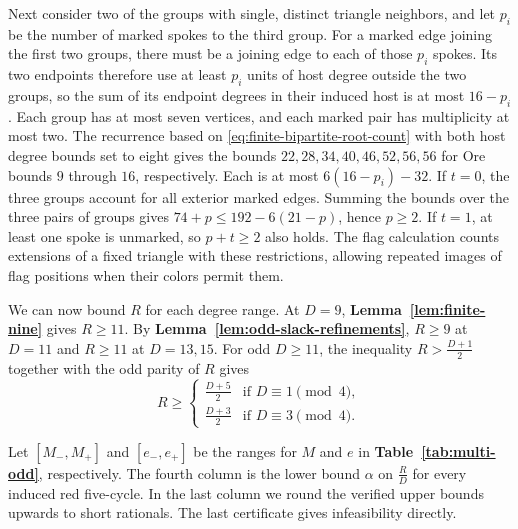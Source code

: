\documentclass[preprint,11pt,numbers]{elsarticle-arxiv}
\numberwithin{equation}{section}
\theoremstyle{definition}
\begin{document}
Next consider two of the groups with single, distinct
triangle neighbors, and let $p_i$ be the number of
marked spokes to the third group. For a marked edge joining the
first two groups, there must be a joining edge to each of those $p_i$
spokes. Its two endpoints therefore use at least $p_i$
units of host degree outside the two groups, so the sum of its
endpoint degrees in their induced host is at most $16-p_i$.
Each group has at most seven vertices, and
each marked pair has multiplicity at most two. The
recurrence based on \eqref{eq:finite-bipartite-root-count} with both host degree bounds set to
eight gives the bounds $22,28,34,40,46,52,56,56$ for
Ore bounds $9$ through $16$, respectively. Each is at
most $6(16-p_i)-32$. If $t=0$, the three groups account
for all exterior marked edges. Summing the bounds over
the three pairs of groups gives $74+p\le192-6(21-p)$,
hence $p\ge2$. If $t=1$, at least one spoke is unmarked,
so $p+t\ge2$ also holds. The flag calculation counts
extensions of a fixed triangle with these restrictions,
allowing repeated images of flag positions when their
colors permit them.

We can now bound $R$ for each degree range. At $D=9$,
\textbf{Lemma~\ref{lem:finite-nine}} gives $R\geq11$.
By \textbf{Lemma~\ref{lem:odd-slack-refinements}},
$R\geq9$ at $D=11$ and $R\geq11$ at $D=13,15$.
For odd $D\geq11$, the inequality $R>\frac{D+1}{2}$ together with the
odd parity of $R$ gives
\begin{equation}\label{eq:multi-slack}
 R\geq
 \begin{cases}
 \frac{D+5}{2} & \text{if }D\equiv1\pmod4,\\
 \frac{D+3}{2} & \text{if }D\equiv3\pmod4.
 \end{cases}
\end{equation}

Let $[M_-,M_+]$ and $[e_-,e_+]$ be the ranges for $M$ and $e$
in \textbf{Table~\ref{tab:multi-odd}}, respectively. The fourth
column is the lower bound $\alpha$ on $\frac{R}{D}$ for every induced
red five-cycle. In the last column we round the verified upper bounds
upwards to short rationals. The last certificate gives
infeasibility directly.
\end{document}
